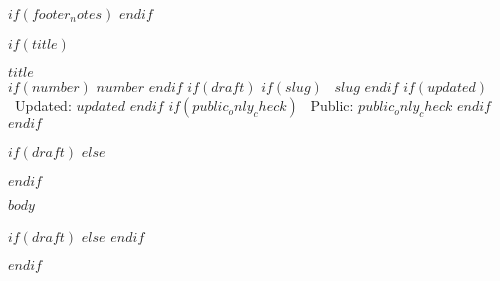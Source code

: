 
\fancyfoot[LE,RO]{}
$if(footer_notes)$
$endif$

$if(title)$
\begin{center}
  {\LARGE\bfseries $title$}\\[6pt]
  {\small
    $if(number)$ $number$ $endif$
    $if(draft)$
    $if(slug)$ \textbullet\ $slug$ $endif$
    $if(updated)$ \textbullet\ Updated: $updated$ $endif$
    $if(public_only_check)$ \textbullet\ Public: $public_only_check$ $endif$
    $endif$
  }
\end{center}
$if(draft)$
$else$
\begingroup
  \setcounter{tocdepth}{0}
  \let\oldsubsection\subsection
  \renewcommand{\subsection}[1]{\oldsubsection*{##1}}
$endif$

$body$

$if(draft)$
$else$
\endgroup
$endif$

\clearpage

$endif$
